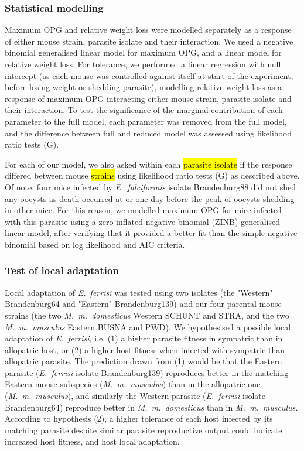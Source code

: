 \documentclass[12pt]{article}
\begin{document}
\subsubsection{Statistical modelling}

Maximum OPG and relative weight loss were modelled separately as a response of either mouse strain, parasite isolate and their interaction. We used a negative binomial generalised linear model for maximum OPG, and a linear model for relative weight loss. For tolerance, we performed a linear regression with null intercept (as each mouse was controlled against itself at start of the experiment, before losing weight or shedding parasite), modelling relative weight loss as a response of maximum OPG interacting either mouse strain, parasite isolate and their interaction. To test the significance of the marginal contribution of each parameter to the full model, each parameter was removed from the full model, and the difference between full and reduced model was assessed using likelihood ratio tests (G). \par

For each of our model, we also asked within each \hl{parasite isolate} if the response differed between mouse \hl{strains} using likelihood ratio tests (G) as described above. Of note, four mice infected by\textit{ E.~falciformis} isolate Brandenburg88 did not shed any oocysts as death occurred at or one day before the peak of oocysts shedding in other mice. For this reason, we modelled maximum OPG for mice infected with this parasite using a zero-inflated negative binomial (ZINB) generalised linear model, after verifying that it provided a better fit than the simple negative binomial based on log likelihood and AIC criteria.\par

\subsubsection{Test of local adaptation}

Local adaptation of \textit{E.~ferrisi} was tested using two isolates (the "Western" Brandenburg64 and "Eastern" Brandenburg139) and our four parental mouse strains (the two \textit{M.~m.~domesticus} Western SCHUNT and STRA, and the two \textit{M.~m.~musculus }Eastern BUSNA and PWD). We hypothesised a possible local adaptation of \textit{E.~ferrisi}, i.e. (1) a higher parasite fitness in sympatric than in allopatric host, or (2) a higher host fitness when infected with sympatric than allopatric parasite. The prediction drawn from (1) would be that the Eastern parasite (\textit{E.~ferrisi} isolate Brandenburg139) reproduces better in the matching Eastern mouse subspecies (\textit{M.~m.~musculus}) than in the allopatric one (\textit{M.~m.~musculus}), and similarly the Western parasite (\textit{E.~ferrisi} isolate Brandenburg64) reproduce better in \textit{M.~m.~domesticus} than in \textit{M.~m.~musculus.} According to hypothesis (2), a higher tolerance of each host infected by its matching parasite despite similar parasite reproductive output could indicate increased host fitness, and host local adaptation.\par
\end{document}
